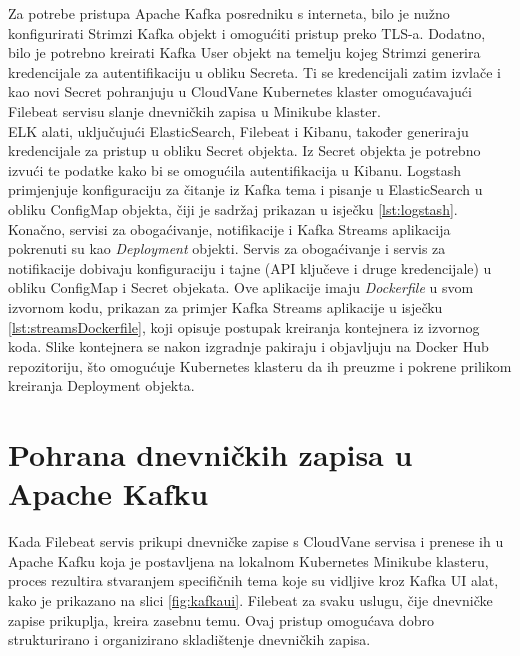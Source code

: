 \documentclass[times, utf8, diplomski]{fer}
\begin{document}
Za potrebe pristupa Apache Kafka posredniku s interneta, bilo je nužno konfigurirati Strimzi Kafka objekt i omogućiti pristup preko TLS-a. Dodatno, bilo je potrebno kreirati Kafka User objekt na temelju kojeg Strimzi generira kredencijale za autentifikaciju u obliku Secreta. Ti se kredencijali zatim izvlače i kao novi Secret pohranjuju u CloudVane Kubernetes klaster omogućavajući Filebeat servisu slanje dnevničkih zapisa u Minikube klaster.\\

ELK alati, uključujući ElasticSearch, Filebeat i Kibanu, također generiraju kredencijale za pristup u obliku Secret objekta. Iz Secret objekta je potrebno izvući te podatke kako bi se omogućila autentifikacija u Kibanu. Logstash primjenjuje konfiguraciju za čitanje iz Kafka tema i pisanje u ElasticSearch u obliku ConfigMap objekta, čiji je sadržaj prikazan u isječku \ref{lst:logstash}.\\

Konačno, servisi za obogaćivanje, notifikacije i Kafka Streams aplikacija pokrenuti su kao \emph{Deployment} objekti. Servis za obogaćivanje i servis za notifikacije dobivaju konfiguraciju i tajne (API ključeve i druge kredencijale) u obliku ConfigMap i Secret objekata. Ove aplikacije imaju \emph{Dockerfile} u svom izvornom kodu, prikazan za primjer Kafka Streams aplikacije u isječku \ref{lst:streamsDockerfile}, koji opisuje postupak kreiranja kontejnera iz izvornog koda. Slike kontejnera se nakon izgradnje pakiraju i objavljuju na Docker Hub repozitoriju, što omogućuje Kubernetes klasteru da ih preuzme i pokrene prilikom kreiranja Deployment objekta.

\section{Pohrana dnevničkih zapisa u Apache Kafku}
\label{sec:kafkaImpl}

Kada Filebeat servis prikupi dnevničke zapise s CloudVane servisa i prenese ih u Apache Kafku koja je postavljena na lokalnom Kubernetes Minikube klasteru, proces rezultira stvaranjem specifičnih tema koje su vidljive kroz Kafka UI alat, kako je prikazano na slici \ref{fig:kafkaui}. Filebeat za svaku uslugu, čije dnevničke zapise prikuplja, kreira zasebnu temu. Ovaj pristup omogućava dobro strukturirano i organizirano skladištenje dnevničkih zapisa.\\
\end{document}
